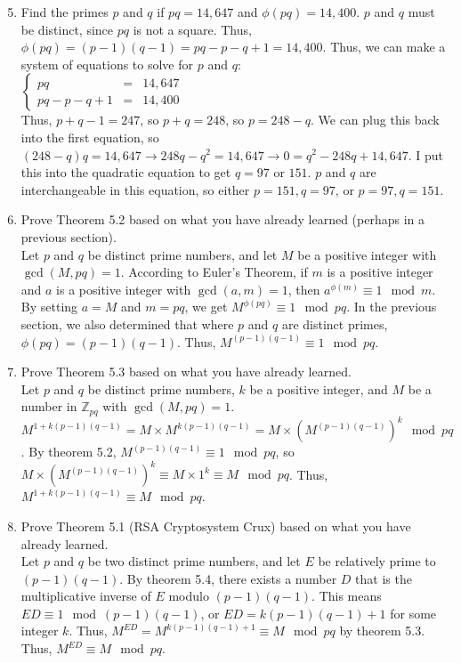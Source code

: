 \documentclass{article}
\begin{document}
\begin{enumerate}
    \setcounter{enumi}{4}
    \item Find the primes $p$ and $q$ if $pq = 14,647$ and $\phi(pq) = 14,400$.
          $p$ and $q$ must be distinct, since $pq$ is not a square. Thus, $\phi(pq) = (p-1)(q-1) = pq - p - q + 1 = 14,400$. Thus, we can make a system of equations to solve for $p$ and $q$:\\
          $\left\{
              \begin{array}{lcr}
                  pq             & = & 14,647 \\
                  pq - p - q + 1 & = & 14,400
              \end{array}
              \right.$\\
          Thus, $p + q - 1 = 247$, so $p + q = 248$, so $ p = 248 - q$. We can plug this back into the first equation, so $(248-q)q = 14,647 \to 248q - q^{2} = 14,647 \to 0 = q^{2} - 248q + 14,647$. I put this into the quadratic equation to get $q = 97 \text{ or } 151$. $p$ and $q$ are interchangeable in this equation, so either $p = 151, q = 97$, or $p = 97, q = 151$.
    \item Prove Theorem 5.2 based on what you have already learned (perhaps in a previous section).\\
          Let $p$ and $q$ be distinct prime numbers, and let $M$ be a positive integer with $\gcd(M, pq) = 1$. According to Euler's Theorem, if $m$ is a positive integer and $a$ is a positive integer with $\gcd(a, m) = 1$, then $a^{\phi(m)} \equiv 1 \mod{m}$. By setting $a = M$ and $m = pq$, we get $M^{\phi(pq)} \equiv 1 \mod{pq}$. In the previous section, we also determined that where $p$ and $q$ are distinct primes, $\phi(pq) = (p-1)(q-1)$. Thus, $M^{(p-1)(q-1)} \equiv 1 \mod{pq}$.
    \item Prove Theorem 5.3 based on what you have already learned.\\
          Let $p$ and $q$ be distinct prime numbers, $k$ be a positive integer, and $M$ be a number in $\mathbb{Z}_{pq}$ with $\gcd(M, pq) = 1$. $M^{1+k(p-1)(q-1)} = M \times M^{k(p-1)(q-1)} = M \times (M^{(p-1)(q-1)})^{k} \mod{pq}$. By theorem 5.2, $M^{(p-1)(q-1)} \equiv 1 \mod{pq}$, so $M \times (M^{(p-1)(q-1)})^{k} \equiv M \times 1^{k} \equiv M \mod{pq}$. Thus, $M^{1+k(p-1)(q-1)} \equiv M \mod{pq}$.
    \item Prove Theorem 5.1 (RSA Cryptosystem Crux) based on what you have already learned.\\
          Let $p$ and $q$ be two distinct prime numbers, and let $E$ be relatively prime to $(p-1)(q-1)$. By theorem 5.4, there exists a number $D$ that is the multiplicative inverse of $E$ modulo $(p-1)(q-1)$. This means $ED \equiv 1 \mod{(p-1)(q-1)}$, or $ED = k(p-1)(q-1) + 1$ for some integer $k$. Thus, $M^{ED} = M^{k(p-1)(q-1) + 1} \equiv M \mod{pq}$ by theorem 5.3. Thus, $M^{ED} \equiv M \mod{pq}$.
\end{enumerate}
\end{document}
